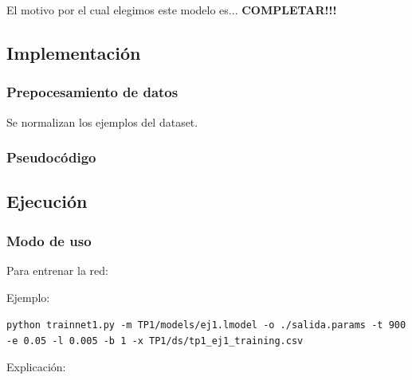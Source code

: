 El motivo por el cual elegimos este modelo es... \textbf{COMPLETAR!!!}


\subsection{Implementación}


\subsubsection{Prepocesamiento de datos}

Se normalizan los ejemplos del dataset.


\subsubsection{Pseudocódigo}


\subsection{Ejecución}


\subsubsection{Modo de uso}

Para entrenar la red:

Ejemplo: 

\noindent\texttt{python trainnet1.py -m TP1/models/ej1.lmodel -o ./salida.params -t 900 -e 0.05 -l 0.005 -b 1 -x TP1/ds/tp1\_ej1\_training.csv}

Explicación:

